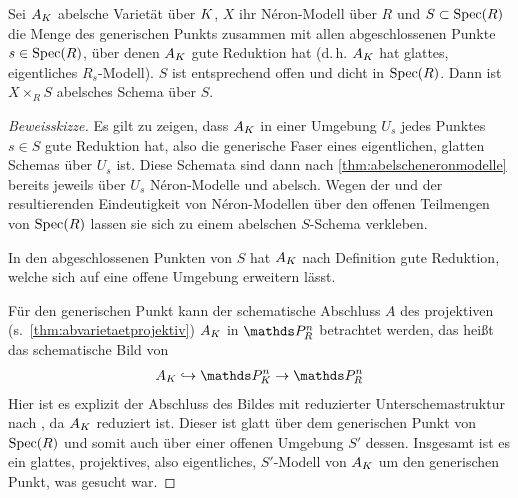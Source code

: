 \begin{Satz}\label{thm:teilwabelscheneronmodelle}
  Sei $A_{K}$ abelsche Varietät über $K$,
  $X$ ihr Néron-Modell über $R$ und
  $S\subset\operatorname{Spec}(R)$ die Menge des generischen Punkts zusammen mit
  allen abgeschlossenen Punkte $s\in\operatorname{Spec}(R)$, über denen $A_{K}$ gute
  Reduktion hat (d.\,h. $A_{K}$ hat glattes, eigentliches $R_s$-Modell).
  $S$ ist entsprechend offen und dicht in $\operatorname{Spec}(R)$.
  Dann ist $X\times_R S$ abelsches Schema über $S$.
  \begin{proof}[Beweisskizze]
    Es gilt zu zeigen, dass $A_{K}$ in einer Umgebung $U_s$ jedes
    Punktes $s\in S$ gute Reduktion hat, also die generische Faser eines
    eigentlichen, glatten Schemas über $U_s$ ist.
    Diese Schemata sind dann nach \ref{thm:abelscheneronmodelle}
    bereits jeweils über $U_s$ Néron-Modelle und abelsch.
    Wegen der \NAbbEig und der resultierenden Eindeutigkeit von
    Néron-Modellen über den offenen Teilmengen von $\operatorname{Spec}(R)$
    lassen sie sich zu einem abelschen $S$-Schema verkleben.

    In den abgeschlossenen Punkten von $S$ hat $A_{K}$ nach Definition
    gute Reduktion, welche sich auf eine offene Umgebung erweitern
    lässt.
    
    Für den generischen Punkt kann der schematische
    Abschluss $A$ des projektiven (s.~\ref{thm:abvarietaetprojektiv})
    $A_{K}$ in $\P_R^n$ betrachtet werden, das heißt das schematische
    Bild von
    \begin{gather*}
      A_\K\hookrightarrow\P_\K^n\to\P_R^n
    \end{gather*}
    Hier ist es explizit der Abschluss des Bildes mit reduzierter
    Unterschemastruktur nach \cite[Remark 10.32]{wedhorn}, da $A_{K}$
    reduziert ist.
    Dieser ist glatt über dem generischen Punkt von $\operatorname{Spec}(R)$
    und somit auch über einer offenen Umgebung $S'$ dessen.
    Insgesamt ist es ein glattes, projektives, also eigentliches,
    $S'$-Modell von $A_{K}$ um den generischen Punkt, was gesucht war.
  \end{proof}
\end{Satz}


